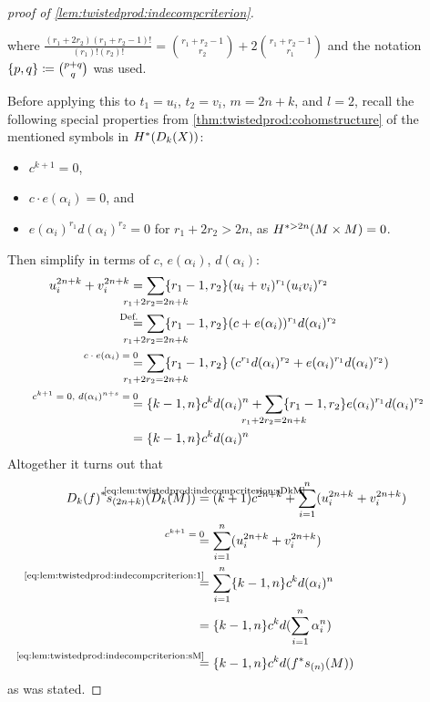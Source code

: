 \begin{proof}[proof of \autoref{lem:twistedprod:indecompcriterion}]
\begin{Lem}
    where $\frac{(r_1+2r_2)(r_1+r_2-1)!}{(r_1)!(r_2)!}
    = \binom{r_1+r_2-1}{r_2} + 2\binom{r_1+r_2-1}{r_1}$
    and the notation $\{p,q\}\coloneqq \binom{p+q}{q}$
    was used.
  \end{Lem}
  Before applying this to $t_1=u_i$, $t_2=v_i$, $m=2n+k$, and $l=2$,
  recall the following special properties from
  \autoref{thm:twistedprod:cohomstructure} of the mentioned symbols in
  $H^*(D_{k}({X}))$:
  \begin{itemize}
  \item $c^{k+1}=0$,
  \item $c\cdot e(\alpha_i)=0$, and
  \item $e(\alpha_i)^{r_1}d(\alpha_i)^{r_2} = 0$ for $r_1+2r_2>2n$,
    as $H^{*>2n}(M\times M)=0$.
  \end{itemize}
  Then simplify in terms of $c$, $e(\alpha_i)$, $d(\alpha_i)$:
  \begin{align}\notag
    u_i^{2n+k} + v_i^{2n+k}
    &= \sum_{\mathclap{r_1+2r_2=2n+k}}
      \altbinom{r_1-1}{r_2} (u_i+v_i)^{r_1}(u_iv_i)^{r_2} \\\notag
    &\equalsby{Def.} \sum_{\mathclap{r_1+2r_2=2n+k}}
      \altbinom{r_1-1}{r_2}
      (c+e(\alpha_i))^{r_1}d(\alpha_i)^{r_2} \\\notag
    &\equalsby{$c\cdot e(\alpha_i)=0$}
      \sum_{\mathclap{r_1+2r_2=2n+k}} \altbinom{r_1-1}{r_2}
      \left(c^{r_1}d(\alpha_i)^{r_2}+e(\alpha_i)^{r_1}d(\alpha_i)^{r_2}\right) \\\notag
    &\equalsby{$c^{k+1}=0$, $d(\alpha_i)^{n+s}=0$}
      \altbinom{k-1}{n} c^k d(\alpha_i)^n
      + \sum_{\mathclap{r_1+2r_2=2n+k}} \altbinom{r_1-1}{r_2}
      e(\alpha_i)^{r_1}d(\alpha_i)^{r_2} \\
    \label{eq:lem:twistedprod:indecompcriterion:1}
    &= \altbinom{k-1}{n} c^k d(\alpha_i)^n      
  \end{align}
  Altogether it turns out that
  \begin{align*}
    \pb{\Twistedprod{k}{f}}\s{(2n+k)}(\Twistedprod{k}{M})
    &\cequalsby{\eqref{eq:lem:twistedprod:indecompcriterion:sDkM}}
      (k+1)c^{2n+k} + \sum_{i=1}^n (u_i^{2n+k} + v_i^{2n+k}) \\
    &\equalsby{$c^{k+1}=0$}
      \sum_{i=1}^n (u_i^{2n+k} + v_i^{2n+k}) \\
    &\equalsby{\eqref{eq:lem:twistedprod:indecompcriterion:1}}
      \sum_{i=1}^n \altbinom{k-1}{n} c^k d(\alpha_i)^n \\
    &= \altbinom{k-1}{n} c^k d(\sum_{i=1}^n \alpha_i^n) \\
    &\equalsby{\eqref{eq:lem:twistedprod:indecompcriterion:sM}}
      \altbinom{k-1}{n} c^k d(\pb f \s{(n)}(M))
  \end{align*}
  as was stated.
\end{proof}

